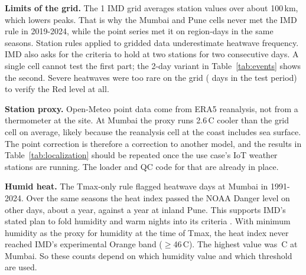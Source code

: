 \textbf{Limits of the grid.} The 1\textdegree{} IMD grid averages station values over about 100\,km, which lowers peaks. That is why the Mumbai and Pune cells never met the IMD rule in 2019-2024, while the point series met it on \LocPointHW{} region-days in the same seasons. Station rules applied to gridded data underestimate heatwave frequency. IMD also asks for the criteria to hold at two stations for two consecutive days. A single cell cannot test the first part; the 2-day variant in Table~\ref{tab:events} shows the second. Severe heatwaves were too rare on the grid (\NSevTest{} days in the test period) to verify the Red level at all.

\textbf{Station proxy.} Open-Meteo point data come from ERA5 reanalysis, not from a thermometer at the site. At Mumbai the proxy runs 2.6\,\textdegree C cooler than the grid cell on average, likely because the reanalysis cell at the coast includes sea surface. The point correction is therefore a correction to another model, and the results in Table~\ref{tab:localization} should be repeated once the use case's IoT weather stations are running. The loader and QC code for that are already in place.

\textbf{Humid heat.} The Tmax-only rule flagged \TmaxhwMumbai{} heatwave days at Mumbai in 1991-2024. Over the same seasons the heat index passed the NOAA Danger level on \HumidMumbai{} other days, about \HumidPerYearMumbai{} a year, against \HumidPerYearPune{} a year at inland Pune. This supports IMD's stated plan to fold humidity and warm nights into its criteria \cite{imd2026criteria}. With minimum humidity as the proxy for humidity at the time of Tmax, the heat index never reached IMD's experimental Orange band ($\ge$46\,\textdegree C). The highest value was \HImaxMumbai\,\textdegree C at Mumbai. So these counts depend on which humidity value and which threshold are used.
